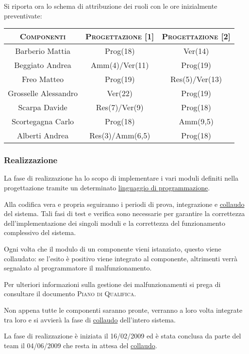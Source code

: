 \documentclass[11pt,a4paper]{article}
\begin{document}
Si riporta ora lo schema di attribuzione dei ruoli con le ore inizialmente preventivate:
\\
\begin{center}
\begin{tabular}{|c||c|c|}
\hline
\textsc{Componenti} & \textsc{Progettazione [1]} & \textsc{Progettazione [2]} \\ \hline \hline
Barberio Mattia & Prog(18) & Ver(14) \\ \hline
Beggiato Andrea & Amm(4)/Ver(11) & Prog(19) \\ \hline
Freo Matteo & Prog(19) & Res(5)/Ver(13) \\ \hline
Grosselle Alessandro & Ver(22) & Prog(19) \\ \hline
Scarpa Davide & Res(7)/Ver(9) & Prog(18) \\ \hline
Scortegagna Carlo & Prog(18) & Amm(9,5) \\ \hline
Alberti Andrea & Res(3)/Amm(6,5) & Prog(18) \\ \hline
\end{tabular}
\end{center}
\bigskip

\subsubsection{Realizzazione}
La fase di realizzazione ha lo scopo di implementare i vari moduli definiti nella progettazione tramite un determinato \underline{linguaggio di programmazione}.

Alla codifica vera e propria seguiranno i periodi di prova, integrazione e \underline{collaudo} del sistema.
Tali fasi di test e verifica sono necessarie per garantire la correttezza dell'implementazione dei singoli moduli e la correttezza del funzionamento complessivo del sistema.

Ogni volta che il modulo di un componente vieni istanziato, questo viene collaudato: se l'esito è positivo viene integrato al componente, altrimenti verrà segnalato al programmatore il malfunzionamento.

Per ulteriori informazioni sulla gestione dei malfunzionamenti si prega di consultare il documento \textsc{Piano di Qualifica}.

Non appena tutte le componenti saranno pronte, verranno a loro volta integrate tra loro e si avvierà la fase di \underline{collaudo} dell'intero sistema.

La fase di realizzazione è iniziata il 16/02/2009 ed è stata conclusa da parte del team il 04/06/2009 che resta in attesa del \underline{collaudo}.
\end{document}
